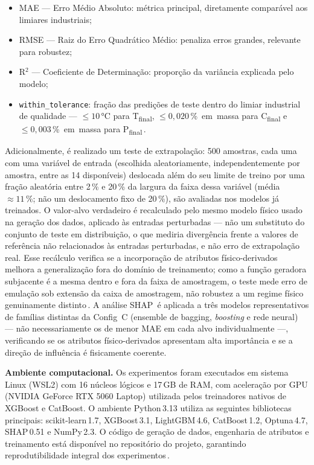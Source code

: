 \begin{itemize}
  \item MAE — Erro Médio Absoluto: métrica principal, diretamente comparável aos limiares industriais;
  \item RMSE — Raiz do Erro Quadrático Médio: penaliza erros grandes, relevante para robustez;
  \item R$^2$ — Coeficiente de Determinação: proporção da variância explicada pelo modelo;
  \item \texttt{within\_tolerance}: fração das predições de teste dentro do limiar industrial de qualidade — $\leq 10$\,°C para T\textsubscript{final}, $\leq 0{,}020$\,\%~em~massa para C\textsubscript{final} e $\leq 0{,}003$\,\%~em~massa para P\textsubscript{final}\,\cite{zhou2024bof,bae2020bof}.
\end{itemize}

Adicionalmente, é realizado um teste de extrapolação: 500 amostras, cada uma com uma variável de entrada (escolhida aleatoriamente, independentemente por amostra, entre as 14 disponíveis) deslocada além do seu limite de treino por uma fração aleatória entre 2\,\% e 20\,\% da largura da faixa dessa variável (média $\approx 11\,\%$; não um deslocamento fixo de 20\,\%), são avaliadas nos modelos já treinados. O valor-alvo verdadeiro é recalculado pelo mesmo modelo físico usado na geração dos dados, aplicado às entradas perturbadas --- não um substituto do conjunto de teste em distribuição, o que mediria divergência frente a valores de referência não relacionados às entradas perturbadas, e não erro de extrapolação real. Esse recálculo verifica se a incorporação de atributos físico-derivados melhora a generalização fora do domínio de treinamento; como a função geradora subjacente é a mesma dentro e fora da faixa de amostragem, o teste mede erro de emulação sob extensão da caixa de amostragem, não robustez a um regime físico genuinamente distinto\,\cite{bae2020bof}. A análise SHAP\,\cite{lundberg2017unified,manojlovic2022eaf} é aplicada a três modelos representativos de famílias distintas da Config~C (ensemble de bagging, \textit{boosting} e rede neural) --- não necessariamente os de menor MAE em cada alvo individualmente ---, verificando se os atributos físico-derivados apresentam alta importância e se a direção de influência é fisicamente coerente.

\textbf{Ambiente computacional.} Os experimentos foram executados em sistema Linux (WSL2) com 16 núcleos lógicos e 17\,GB de RAM, com aceleração por GPU (NVIDIA GeForce RTX 5060 Laptop) utilizada pelos treinadores nativos de XGBoost e CatBoost. O ambiente Python\,3.13 utiliza as seguintes bibliotecas principais: scikit-learn\,1.7, XGBoost\,3.1, LightGBM\,4.6, CatBoost\,1.2, Optuna\,4.7, SHAP\,0.51 e NumPy\,2.3. O código de geração de dados, engenharia de atributos e treinamento está disponível no repositório do projeto, garantindo reprodutibilidade integral dos experimentos\,\cite{buggineni2024synthetic}.

